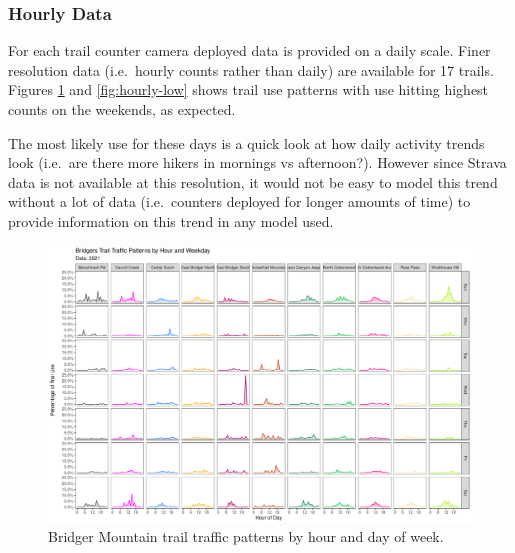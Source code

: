 \documentclass[
]{book}
\begin{document}
\hypertarget{hourly-data}{%
\subsubsection{Hourly Data}\label{hourly-data}}

For each trail counter camera deployed data is provided on a daily
scale. Finer resolution data (i.e.~hourly counts rather than daily) are
available for 17 trails. Figures \ref{fig:hourly-high} and
\ref{fig:hourly-low} shows trail use patterns with use hitting highest
counts on the weekends, as expected.

The most likely use for these days is a quick look at how daily activity
trends look (i.e.~are there more hikers in mornings vs afternoon?).
However since Strava data is not available at this resolution, it would
not be easy to model this trend without a lot of data (i.e.~counters
deployed for longer amounts of time) to provide information on this
trend in any model used.

\begin{figure}

{\centering \includegraphics[width=1\linewidth]{../figures/hourly_bydayofweek_highuse} 

}

\caption{Bridger Mountain trail traffic patterns by hour and day of week.}\label{fig:hourly-high}
\end{figure}
\end{document}
